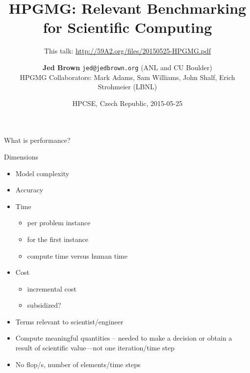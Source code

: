 \documentclass{beamer}
\title{HPGMG: Relevant Benchmarking for Scientific Computing}
\subtitle{This talk: \url{http://59A2.org/files/20150525-HPGMG.pdf}}
\author{{\bf Jed Brown} \texttt{jed@jedbrown.org} (ANL and CU Boulder)\\
{\small HPGMG Collaborators: Mark Adams, Sam Williams, John Shalf, Erich Strohmeier (LBNL)}}
\date{HPCSE, Czech Republic, 2015-05-25}
\begin{document}
\lstset{language=C}
\normalem

\begin{frame}
  \titlepage
\end{frame}

\begin{frame}{What is performance?}
  \begin{block}{Dimensions}
    \begin{itemize}
    \item Model complexity
    \item Accuracy
    \item Time
      \begin{itemize}
      \item per problem instance
      \item for the first instance
      \item compute time versus human time
      \end{itemize}
    \item Cost
      \begin{itemize}
      \item incremental cost
      \item subsidized?
      \end{itemize}
    \end{itemize}
  \end{block}
  \begin{itemize}
  \item Terms relevant to scientist/engineer
  \item Compute meaningful quantities -- needed to make a decision or obtain a result of scientific value---not one iteration/time step
  \item No flop/s, number of elements/time steps
  \end{itemize}
\end{frame}
\end{document}
